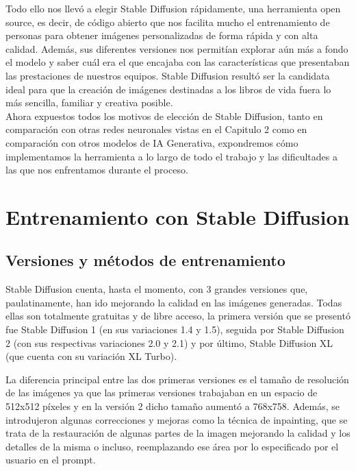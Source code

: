 Todo ello nos llevó a elegir Stable Diffusion rápidamente, una herramienta open source, es decir, de código abierto que nos facilita mucho el entrenamiento de personas para obtener imágenes personalizadas de forma rápida y con alta calidad. Además, sus diferentes versiones nos permitían explorar aún más a fondo el modelo y saber cuál era el que encajaba con las características que presentaban las prestaciones de nuestros equipos. Stable Diffusion resultó ser la candidata ideal para que la creación de imágenes destinadas a  los libros de vida fuera lo más sencilla, familiar y creativa posible. \\

Ahora expuestos todos los motivos de elección de Stable Diffusion, tanto en comparación con otras redes neuronales vistas en el Capitulo 2 como en comparación con otros modelos de IA Generativa, expondremos cómo implementamos la herramienta a lo largo de todo el trabajo y las dificultades a las que nos enfrentamos durante el proceso. \\

\section{Entrenamiento con Stable Diffusion}

\subsection{Versiones y métodos de entrenamiento}

Stable Diffusion cuenta, hasta el momento, con 3 grandes versiones que, paulatinamente, han ido mejorando la calidad en las imágenes generadas. Todas ellas son totalmente gratuitas y de libre acceso, la primera versión que se presentó fue Stable Diffusion 1 (en sus variaciones 1.4 y 1.5), seguida por Stable Diffusion 2 (con sus respectivas variaciones 2.0 y 2.1) y por último, Stable Diffusion XL (que cuenta con su variación XL Turbo). 

La diferencia principal entre las dos primeras versiones es el tamaño de resolución de las imágenes ya que las primeras versiones trabajaban en un espacio de 512x512 píxeles y en la versión 2 dicho tamaño aumentó a 768x758. Además, se introdujeron algunas correcciones y mejoras como la técnica de inpainting, que se trata de la restauración de algunas partes de la imagen mejorando la calidad y los detalles de la misma o incluso, reemplazando ese área por lo especificado por el usuario en el prompt.

